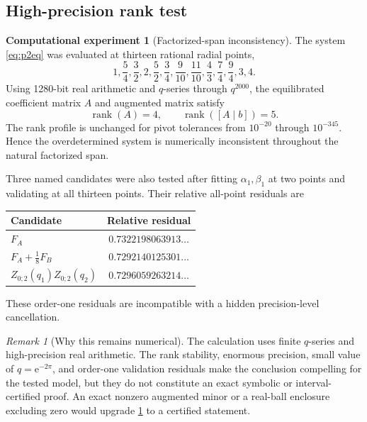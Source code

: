 \documentclass[11pt]{article}
\theoremstyle{definition}
\newtheorem{experiment}[theorem]{Computational experiment}
\theoremstyle{remark}
\newtheorem{remark}[theorem]{Remark}
\newcommand{\e}{\mathrm{e}}
\newcommand{\rank}{\operatorname{rank}}
\begin{document}
\subsection{High-precision rank test}

\begin{experiment}[Factorized-span inconsistency]\label{exp:rank}
The system \eqref{eq:p2eq} was evaluated at thirteen rational radial points,
\begin{equation}\label{eq:points}
 1,\frac54,\frac32,2,\frac52,
 \frac34,\frac9{10},\frac{11}{10},\frac43,
 \frac74,\frac94,3,4.
\end{equation}
Using 1280-bit real arithmetic and \(q\)-series through \(q^{2000}\), the equilibrated coefficient matrix \(A\) and augmented matrix satisfy
\begin{equation}\label{eq:ranknumerical}
 \rank(A)=4,
 \qquad
 \rank([A\mid b])=5.
\end{equation}
The rank profile is unchanged for pivot tolerances from \(10^{-20}\) through \(10^{-345}\).  Hence the overdetermined system is numerically inconsistent throughout the natural factorized span.
\end{experiment}

Three named candidates were also tested after fitting \(\alpha_1,\beta_1\) at two points and validating at all thirteen points.  Their relative all-point residuals are
\begin{center}
\begin{tabular}{lc}
\toprule
Candidate & Relative residual \\
\midrule
\(F_A\) & \(0.7322198063913\ldots\) \\
\(F_A+\tfrac18F_B\) & \(0.7292140125301\ldots\) \\
\(Z_{0;2}(q_1)Z_{0;2}(q_2)\) & \(0.7296059263214\ldots\) \\
\bottomrule
\end{tabular}
\end{center}
These order-one residuals are incompatible with a hidden precision-level cancellation.

\begin{remark}[Why this remains numerical]
The calculation uses finite \(q\)-series and high-precision real arithmetic.  The rank stability, enormous precision, small value of \(q=\e^{-2\pi}\), and order-one validation residuals make the conclusion compelling for the tested model, but they do not constitute an exact symbolic or interval-certified proof.  An exact nonzero augmented minor or a real-ball enclosure excluding zero would upgrade \cref{exp:rank} to a certified statement.
\end{remark}
\end{document}
